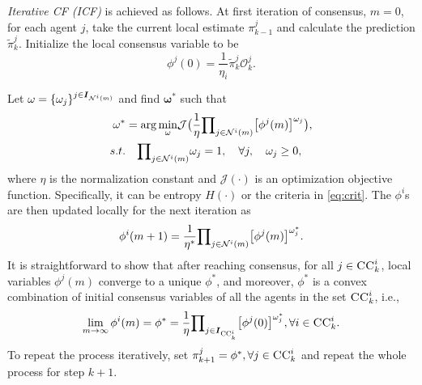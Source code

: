 \documentclass[conference]{IEEEtran}
\newcommand{\vect}[1]{{\mathbf{#1}}}
\theoremstyle{remark}
\newcommand{\bIs}[1]{\boldsymbol{I}_{#1}}  %
\newcommand{\suf}[1]{\textsc{\tiny #1}}  %
\begin{document}
\emph{Iterative CF (ICF)} is achieved as follows. At  first 
iteration of consensus, $m=0$, for each agent $j$, take the current local 
estimate ${\pi}_{k-1}^j$ and calculate the prediction $\tilde{\pi}_k^j$. 
Initialize the local 
consensus variable to be  $$\mathcal{\phi}^j(0) 
=\frac{1}{\eta_i}\tilde{\pi}_k^j\mathcal{O}_k^j. $$ 

Let $\vect{\omega}= \{\omega_{j}\}^{j\in\bIs{{\cal N}^{i}(m)}}$ and find 
$\vect{\omega}^*$ such 
that 
\begin{equation}
\label{eq:opt_problem}
\begin{aligned}
\vect{\omega}^* &= { \arg \min_{\omega}}  \mathcal{J} \big( \frac{1}{\eta} {\prod\nolimits_{j \in {\cal N}^{i}(m)} }  \big[\mathcal{\phi}^j(m)\big]^{\omega_{j}} \big), \\
s.t. &\quad  {\prod\nolimits_{j \in {\cal N}^{i}(m)}} \omega_{j}= 1, \quad \forall j, \quad \omega_j\geq 0,
\end{aligned}
\end{equation}
where $\eta$ is the normalization constant and $\mathcal{J}(\cdot)$ is an 
optimization objective function. Specifically, it can be entropy $H(\cdot)$ or 
the criteria in \eqref{eq:crit}. The $\mathcal{\phi}^i$s are then updated locally 
for the next iteration as
\begin{equation}
\mathcal{\phi}^i(m + 1) = 	\frac{1}{\eta^*} {\prod\nolimits_{j \in {\cal N}^{i}(m)} }  \big[\mathcal{\phi}^j(m)\big]^{\omega_{j}^*}.
\end{equation}
It is straightforward to show that after reaching consensus, 
for all $j \in \textsc{CC}^i_k$, local variables $\mathcal{\phi}^j(m)$ converge 
to a unique $\mathcal{\phi}^*$, and moreover, $\mathcal{\phi}^*$ is
a convex combination of initial consensus 
variables of all the agents in the set $\textsc{CC}^i_k$, i.e.,
\begin{equation}
\lim\limits_{m\rightarrow 
	\infty}\vect{\phi}^{i}(m) = \mathcal{\phi}^*=	
\frac{1}{\eta} 
{\prod\nolimits_{j \in \bIs{\suf{CC}^i_k} } }  
\big[\mathcal{\phi}^j(0)\big]^{\omega_{j}^*},\forall i \in \textsc{CC}^i_k.
\end{equation}
To repeat the process iteratively, set ${\pi}_{k+1}^j = \mathcal{\phi}^*, \forall j \in \textsc{CC}^i_k$ and 
repeat the whole process for step $k+1$.
\end{document}

